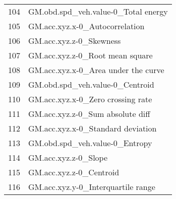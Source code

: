 \begin{tabular}{ll}
104 &               GM.obd.spd\_veh.value-0\_Total energy \\
105 &                    GM.acc.xyz.x-0\_Autocorrelation \\
106 &                           GM.acc.xyz.z-0\_Skewness \\
107 &                   GM.acc.xyz.z-0\_Root mean square \\
108 &               GM.acc.xyz.x-0\_Area under the curve \\
109 &                   GM.obd.spd\_veh.value-0\_Centroid \\
110 &                 GM.acc.xyz.x-0\_Zero crossing rate \\
111 &                  GM.acc.xyz.z-0\_Sum absolute diff \\
112 &                 GM.acc.xyz.x-0\_Standard deviation \\
113 &                    GM.obd.spd\_veh.value-0\_Entropy \\
114 &                              GM.acc.xyz.z-0\_Slope \\
115 &                           GM.acc.xyz.z-0\_Centroid \\
116 &                GM.acc.xyz.y-0\_Interquartile range \\
\bottomrule
\end{tabular}

